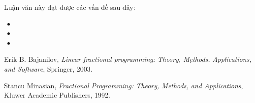 \documentclass[12pt,a4paper]{report}
\begin{document}
Luận văn này đạt được các vấn đề sau đây:

\begin{itemize}
	\item 
	\item 
	\item
\end{itemize}



\begin{thebibliography}{99}
	\thispagestyle{fancy}
	
	
	
	
	 Erik B. Bajanilov, {\it Linear fractional programming: Theory, Mẹthods, Applications, and Software}, Springer, 2003.
		
	 Stancu Minasian, {\it Fractional Programming: Theory, Methods, and Applications}, Kluwer Academic Publishers, 1992.
	

	
	
\end{thebibliography}
\end{document}
